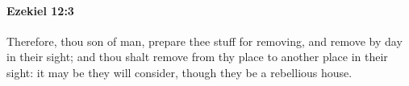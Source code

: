 
		\paragraph{Ezekiel 12:3} %
			\label{EZEKIEL-12-3}

			Therefore, thou son of man, prepare thee stuff for removing, and remove by day in their sight; and thou shalt remove from thy place to another place in their sight: it may be they will consider, though they be a rebellious house.


